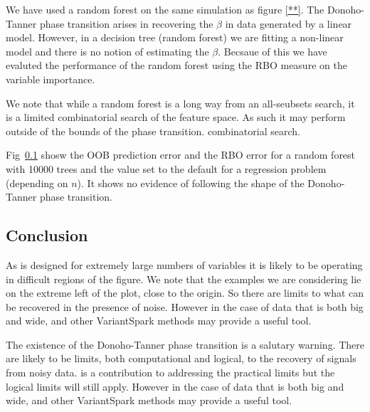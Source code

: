 We have used a random forest on the same simulation as figure \ref{**}.  The Donoho-Tanner phase transition arises in
recovering the $\beta$ in data generated by a linear model. However, in a decision tree (random forest) we are fitting a
non-linear model and there is no notion of estimating the $\beta$. Becsaue of this we have evaluted the performance of
the random forest using the RBO measure on the variable importance.

We note that while a random forest is a long way from an all-seubsets search, it is a limited combinatorial search of
the feature space. As such it may perform outside of the bounds of the phase transition. 
  combinatorial search.

Fig~\ref{} shosw the OOB prediction error and the RBO error for a random forest with 10000 trees and the \mtry value set
to the default for a regression problem (depending on $n$). It shows no evidence of following the shape of the
Donoho-Tanner phase transition.


\subsection{Conclusion}

As \cursedforest is designed for extremely large numbers of variables it is likely to be operating in difficult regions of the figure.
We note that the examples we are considering lie on the extreme left of the plot, close to the origin. So there are
limits to what can be recovered in the presence of noise. However in the case of data that is both big and wide,
\cursedforest and other VariantSpark methods may provide a useful tool.

The existence of the  Donoho-Tanner phase transition is a salutary warning. There are likely to be limits, both
computational and logical, to the recovery of signals from noisy data. \cursedforest  is a contribution to addressing the
practical limits but the logical limits will still apply. However in the case of data that is both big and wide,
\cursedforest and other VariantSpark methods may provide a useful tool.










